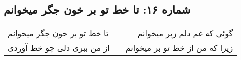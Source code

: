 \begin{center}
\section*{شماره ۱۶: تا خط تو بر خون جگر میخوانم}
\label{sec:016}
\begin{longtable}{l p{0.5cm} r}
تا خط تو بر خون جگر میخوانم
&&
گوئی که غم دلم زبر میخوانم
\\
از من ببری دلی چو خط آوردی
&&
زیرا که من از خط تو بر میخوانم
\\
\end{longtable}
\end{center}
